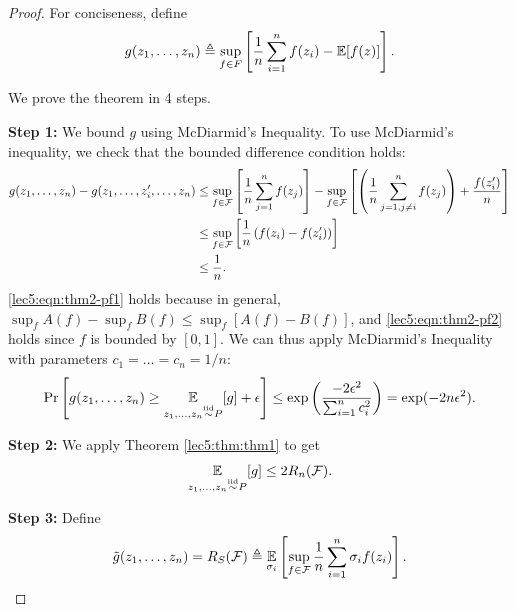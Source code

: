 \begin{proof}
For conciseness, define
\begin{equation} g(z_1, \dots, z_n) \triangleq \sup_{f\in F} \left[ \frac{1}{n} \sum^{n}_{i=1} f(z_i) - \operatorname*{\mathbb{E}}[f(z)]\right]. \end{equation}

We prove the theorem in 4 steps.

\textbf{Step 1:} We bound $g$ using McDiarmid's Inequality. To use McDiarmid's inequality, we check that the bounded difference condition holds:
\begin{align}
    g(z_1, \dots, z_n) - g(z_1, \dots, z_i', \dots, z_n)
    &\leq \sup_{f\in \mathcal F} \left[ \frac{1}{n} \sum^{n}_{j=1} f(z_j) \right] - \sup_{f\in \mathcal F} \left[ \left(\frac{1}{n} \sum^{n}_{j=1, j \neq i} f(z_j)\right) + \frac{f(z_i')}{n} \right]  \\
    &\leq \sup_{f\in \mathcal F}\left[ \frac{1}{n} \left( f(z_i) - f(z_i') \right) \right] \label{lec5:eqn:thm2-pf1} \\
    &\leq \frac{1}{n}. \label{lec5:eqn:thm2-pf2}
\end{align}
\eqref{lec5:eqn:thm2-pf1} holds because in general, $\sup_f A(f) - \sup_f B(f) \leq \sup_f [A(f) - B(f)]$, and \eqref{lec5:eqn:thm2-pf2} holds since $f$ is bounded by $[0,1]$. We can thus apply McDiarmid's Inequality with parameters $c_1 = \dots = c_n = 1/n$:
\begin{align}
    \Pr\left[ g(z_1, \dots, z_n) \geq \operatorname*{\mathbb{E}}_{z_1,\dots, z_n \overset{\textup{iid}}{\sim} P}[g] + \epsilon \right] \leq \exp{\left( \frac{-2\epsilon^2}{\sum^n_{i=1} c_i^2 }\right)} = \exp(-2n\epsilon^2).
\end{align}

\textbf{Step 2:} We apply Theorem \ref{lec5:thm:thm1} to get 
\begin{align}
 \operatorname*{\mathbb{E}}_{z_1,\dots, z_n \overset{\textup{iid}}{\sim} P}[g] \leq 2R_n(\mathcal F).
\end{align}

\textbf{Step 3:} Define
\begin{equation} \tilde g (z_1, \dots, z_n) = R_S(\mathcal F) \triangleq \operatorname*{\mathbb{E}}_{\sigma_i}\left[\sup_{f\in \mathcal F} \frac{1}{n} \sum^n_{i=1} \sigma_i f(z_i)\right]. \end{equation}


\end{proof}
